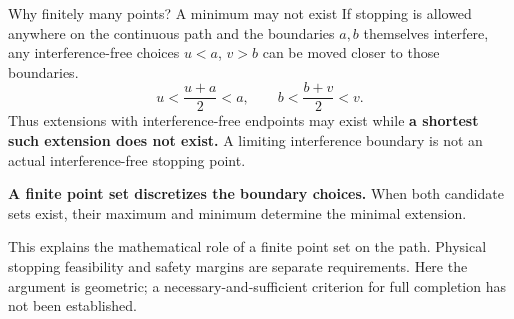 \begin{frame}{Why finitely many points? A minimum may not exist}
\small
If stopping is allowed anywhere on the continuous path and the boundaries $a,b$ themselves interfere,
any interference-free choices $u<a$, $v>b$ can be moved closer to those boundaries.
\begin{equation}
 u<\frac{u+a}{2}<a,\qquad
 b<\frac{b+v}{2}<v.\tag{26}
\end{equation}
Thus extensions with interference-free endpoints may exist while
\textbf{a shortest such extension does not exist.}
A limiting interference boundary is not an actual interference-free stopping point.
\begin{center}\end{center}
\textbf{A finite point set discretizes the boundary choices.}
When both candidate sets exist, their maximum and minimum determine the minimal extension.
\par\medskip\footnotesize
This explains the mathematical role of a finite point set on the path. Physical stopping feasibility and safety margins
are separate requirements. Here the argument is geometric; a necessary-and-sufficient criterion for full completion
has not been established.
\end{frame}

